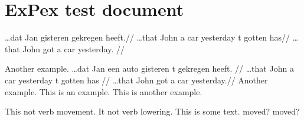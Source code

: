 \documentclass{article}
\begin{document}
\section*{ExPex test document}

\pex
\a\arrowgloss
\begingl[aboveglbskip=\glarrowheight]
\gla        \ldots dat Jan  gisteren    gekregen heeft.//
\glb        \ldots that John {a\hspace*{1em} car}  yesterday t  gotten has//
\glft       \ldots that John got a car yesterday.
// 
\endgl

\a Another example.
\a\begingl
\gla        \ldots dat Jan een auto gisteren t gekregen heeft.  //
\glb        \ldots that John a car  yesterday t gotten has  //
\glft       \ldots that John got a car yesterday.//
\endgl
\a Another example.
\xe
%
\pex
\a This is an example.
\a This is another example.
\xe


\pex
\a This  not  verb movement.
\a It   not  verb lowering.
\xe
This is some text.
\arrowstrut
\pex
\a{}   
moved? 
 
\a{}   
moved?  
\xe
\end{document}
